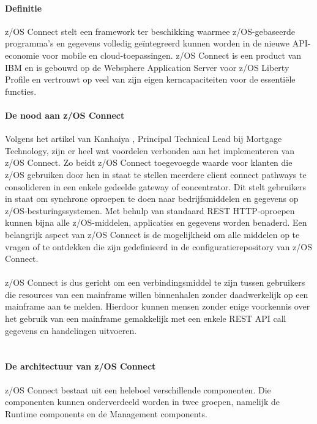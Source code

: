 \paragraph{Definitie}
z/OS Connect stelt een framework ter beschikking waarmee z/OS-gebaseerde programma's en gegevens volledig geïntegreerd kunnen worden in de nieuwe API-economie voor mobile en cloud-toepassingen. z/OS Connect is een product van IBM en is gebouwd op de Websphere Application Server voor z/OS Liberty Profile en vertrouwt op veel van zijn eigen kerncapaciteiten voor de essentiële functies. \autocite{IBMe}

\paragraph{De nood aan z/OS Connect}
Volgens het artikel van Kanhaiya \textcite{Kumar2021}, Principal Technical Lead bij Mortgage Technology, zijn er heel wat voordelen verbonden aan het implementeren van z/OS Connect. Zo beidt z/OS Connect toegevoegde waarde voor klanten die z/OS gebruiken door hen in staat te stellen meerdere client connect pathways te consolideren in een enkele gedeelde gateway of concentrator. Dit stelt gebruikers in staat om synchrone oproepen te doen naar bedrijfsmiddelen en gegevens op z/OS-besturingssystemen. Met behulp van standaard REST HTTP-oproepen kunnen bijna alle z/OS-middelen, applicaties en gegevens worden benaderd. Een belangrijk aspect van z/OS Connect is de mogelijkheid om alle middelen op te vragen of te ontdekken die zijn gedefinieerd in de configuratierepository van z/OS Connect. \autocite{IBMe}
\\ \\
z/OS Connect is dus gericht om een verbindingsmiddel te zijn tussen gebruikers die resources van een mainframe willen binnenhalen zonder daadwerkelijk op een mainframe aan te melden. Hierdoor kunnen mensen zonder enige voorkennis over het gebruik van een mainframe gemakkelijk met een enkele REST API call gegevens en handelingen uitvoeren. \autocite{IBMe}
\\ \\
\paragraph{De architectuur van z/OS Connect}
z/OS Connect bestaat uit een heleboel verschillende componenten. Die componenten kunnen onderverdeeld worden in twee groepen, namelijk de Runtime components en de Management components.


